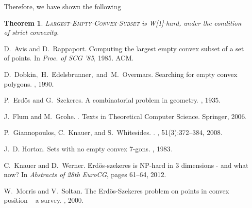 \documentclass[11pt,a4paper]{article}
\newtheorem{theorem}[definition]{Theorem}
\begin{document}
Therefore, we have shown the following

\begin{theorem}
\textsc{Largest-Empty-Convex-Subset} is W[1]-hard, under the condition of strict convexity.
\end{theorem}




\begin{thebibliography}{1}

D.~Avis and D.~Rappaport.
\newblock Computing the largest empty convex subset of a set of points.
\newblock In {\em Proc. of SCG '85}, 1985. ACM.

\mbox{D.~Dobkin, H.~Edelsbrunner, and M.~Overmars.}
\newblock \allowbreak Sear\-ching for empty convex polygons.
, 1990.

P.~Erd\"os and G.~Szekeres.
\newblock A combinatorial problem in geometry.
, 1935.

J.~Flum and M.~Grohe.
.
\newblock Texts in Theoretical Computer Science. Springer, 2006.

P.~Giannopoulos, C.~Knauer, and S.~Whitesides.
.
, 51(3):372--384, 2008.

J.~D. Horton.
\newblock Sets with no empty convex 7-gons.
, 1983.

C.~Knauer and D.~Werner.
\newblock Erd\"os-szekeres is {NP}-hard in $3$ dimensions - and what now?
\newblock In {\em Abstracts of 28th EuroCG}, pages 61--64, 2012.

W.~Morris and V.~Soltan.
\newblock The {Erd\"os-Szekeres} problem on points in convex position -- a
  survey.
, 2000.

\end{thebibliography}
\end{document}
